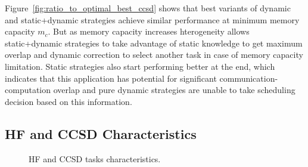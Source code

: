 \documentclass[runningheads]{llncs} %
\begin{document}
Figure~\ref{fig:ratio_to_optimal_best_ccsd} shows that best variants of dynamic and static+dynamic strategies achieve similar performance at minimum memory capacity $m_c$. But as memory capacity increases hterogeneity allows static+dynamic strategies to take advantage of static knowledge to get maximum overlap and dynamic correction to select another task in case of memory capacity limitation. Static strategies also start performing better at the end, which indicates that this application has potential for significant communication-computation overlap and pure dynamic strategies are unable to take scheduling decision based on this information.

\subsection{HF and CCSD Characteristics}
 
 \begin{figure}[htb]
	\caption{HF and CCSD tasks characteristics.}
    \label{fig:ApplicationProperties}
 \end{figure}
 
 
\end{document}
